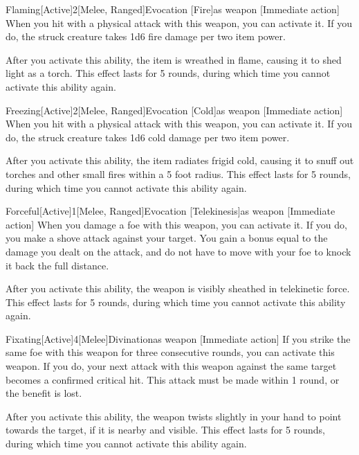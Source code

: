         \begin{magicitemdef}{Flaming}[Active]{2}[Melee, Ranged]{Evocation [Fire]}{as weapon}
            [Immediate action] When you hit with a physical attack with this weapon, you can activate it.
            If you do, the struck creature takes 1d6 fire damage per two item power.

            After you activate this ability, the item is wreathed in flame, causing it to shed light as a torch.
            This effect lasts for 5 rounds, during which time you cannot activate this ability again.
        \end{magicitemdef}

        \begin{magicitemdef}{Freezing}[Active]{2}[Melee, Ranged]{Evocation [Cold]}{as weapon}
            [Immediate action] When you hit with a physical attack with this weapon, you can activate it.
            If you do, the struck creature takes 1d6 cold damage per two item power.

            After you activate this ability, the item radiates frigid cold, causing it to snuff out torches and other small fires within a 5 foot radius.
            This effect lasts for 5 rounds, during which time you cannot activate this ability again.
        \end{magicitemdef}

        \begin{magicitemdef}{Forceful}[Active]{1}[Melee, Ranged]{Evocation [Telekinesis]}{as weapon}
            [Immediate action] When you damage a foe with this weapon, you can activate it.
            If you do, you make a shove attack against your target.
            You gain a bonus equal to the damage you dealt on the attack, and do not have to move with your foe to knock it back the full distance.

            After you activate this ability, the weapon is visibly sheathed in telekinetic force.
            This effect lasts for 5 rounds, during which time you cannot activate this ability again.
        \end{magicitemdef}

        \begin{magicitemdef}{Fixating}[Active]{4}[Melee]{Divination}{as weapon}
            [Immediate action] If you strike the same foe with this weapon for three consecutive rounds, you can activate this weapon.
            If you do, your next attack with this weapon against the same target becomes a confirmed critical hit.
            This attack must be made within 1 round, or the benefit is lost.

            After you activate this ability, the weapon twists slightly in your hand to point towards the target, if it is nearby and visible.
            This effect lasts for 5 rounds, during which time you cannot activate this ability again.
        \end{magicitemdef}

